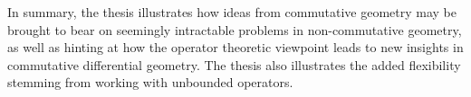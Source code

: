 
In summary, the thesis illustrates how ideas from commutative geometry may be brought to bear on seemingly intractable problems in non-commutative geometry, as well as hinting at how the operator theoretic viewpoint leads to new insights in commutative differential geometry. The thesis also illustrates the added flexibility stemming from working with unbounded operators.
